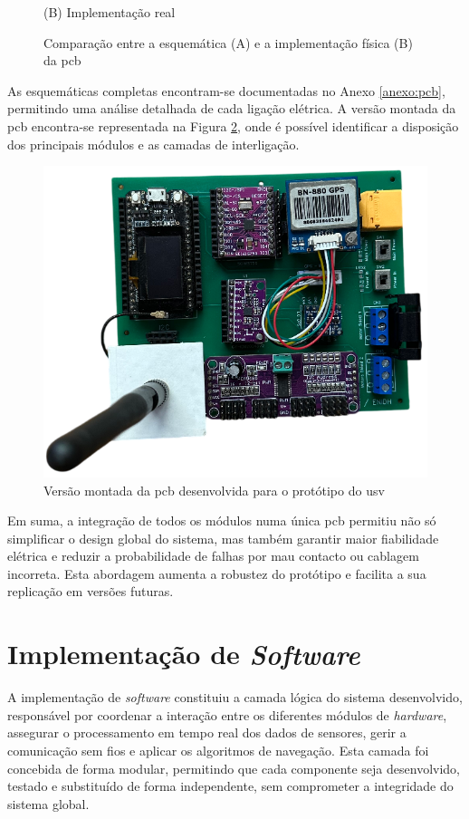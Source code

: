 \begin{figure}[H]
\begin{minipage}{0.40\linewidth}
        \caption*{(B) Implementação real}
    \end{minipage}
    \caption{Comparação entre a esquemática (A) e a implementação física (B) da \gls{pcb}}
    \label{fig:pcb-esquematica-vs-real}
\end{figure}

As esquemáticas completas encontram-se documentadas no Anexo \ref{anexo:pcb}, permitindo uma análise detalhada de cada ligação elétrica. A versão montada da \gls{pcb} encontra-se representada na Figura \ref{fig:pcb-final}, onde é possível identificar a disposição dos principais módulos e as camadas de interligação.  

\begin{figure}[H]
    \centering
    \includegraphics[width=0.5\linewidth]{figuras/pcb-final.png}
    \caption{Versão montada da \gls{pcb} desenvolvida para o protótipo do \gls{usv}}
    \label{fig:pcb-final}
\end{figure}

Em suma, a integração de todos os módulos numa única \gls{pcb} permitiu não só simplificar o design global do sistema, mas também garantir maior fiabilidade elétrica e reduzir a probabilidade de falhas por mau contacto ou cablagem incorreta. Esta abordagem aumenta a robustez do protótipo e facilita a sua replicação em versões futuras.

\section{Implementação de \emph{Software}}
\label{sec:implementacao-software}

A implementação de \emph{software} constituiu a camada lógica do sistema desenvolvido, responsável por coordenar a interação entre os diferentes módulos de \emph{\emph{hardware}}, assegurar o processamento em tempo real dos dados de sensores, gerir a comunicação sem fios e aplicar os algoritmos de navegação. Esta camada foi concebida de forma modular, permitindo que cada componente seja desenvolvido, testado e substituído de forma independente, sem comprometer a integridade do sistema global.  

